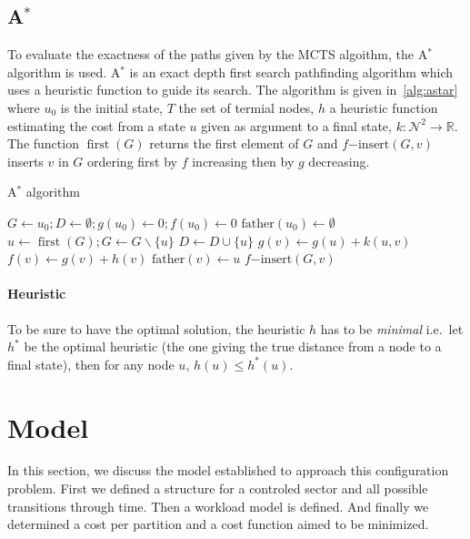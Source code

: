 \documentclass[oneside,twocolumn]{article}
\DeclareMathOperator{\first}{first}
\begin{document}
\subsection{A\(^*\)}
To evaluate the exactness of the paths given by the MCTS algoithm, the A\(^*\)
algorithm is used. A\(^*\) is an exact depth first search pathfinding algorithm
which uses a heuristic function to guide its search. The algorithm is given
in~\ref{alg:astar} where \(u_0\) is the initial state, \(T\) the set of termial
nodes, \(h\) a heuristic function estimating the cost from a state \(u\) given
as argument to a final state, \(k \colon \mathcal{N}^2 \to \mathbb{R}\). The
function \(\first(G)\) returns the first element of \(G\) and
\(f\mathup{-insert}(G, v)\) inserts \(v\) in \(G\) ordering first by \(f\)
increasing then by \(g\) decreasing.
\begin{algorithm}
  \caption{A\(^*\) algorithm~\cite{alliotschiex2002ia&it}}\label{alg:astar}
  \begin{algorithmic}
    \State{}\(G \gets u_0; D \gets \emptyset; g(u_0) \gets 0; f(u_0) \gets 0\)
    \State{}\(\mathup{father}(u_0) \gets \emptyset\)
    \State{}\(u \gets \first(G); G \gets G \backslash \{u\}\)
    \State{}\(D \gets D \cup \{u\}\)
    \State{}
    \EndIf{}
    \State{}\(g(v) \gets g(u) + k(u, v)\)
    \State{}\(f(v) \gets g(v) + h(v)\)
    \State{}\(\mathup{father}(v) \gets u\)
    \State{}\(f\mathup{-insert}(G, v)\)
    \EndIf{}
    \EndFor{}
    \EndWhile{}
    \EndProcedure{}
  \end{algorithmic}
\end{algorithm}

\paragraph{Heuristic}
To be sure to have the optimal solution, the heuristic \(h\) has to be
\emph{minimal} i.e.\ let \(h^*\) be the optimal heuristic (the one giving the
true distance from a node to a final state), then for any node \(u\), \(h(u)
\leq h^*(u)\).


\section{Model}

In this section, we discuss the model established to approach this configuration
problem. First we defined a structure for a controled sector and all possible
transitions through time. Then a workload model is defined. And finally we
determined a cost per partition and a cost function aimed to be minimized.
\end{document}
